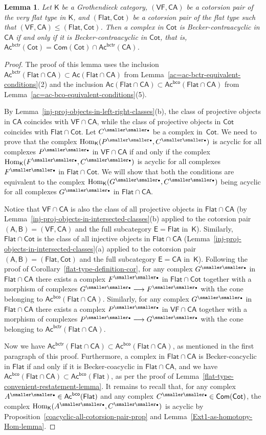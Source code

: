 \documentclass[12pt,a4paper]{amsart}
\newcommand{\+}{\nobreakdash-}
\renewcommand{\:}{\colon}
\newcommand{\rarrow}{\longrightarrow}
\newcommand{\bu}{{\text{\smaller\smaller$\scriptstyle\bullet$}}}
\DeclareMathOperator{\Hom}{Hom}
\newcommand{\sA}{\mathsf A}
\newcommand{\sB}{\mathsf B}
\newcommand{\sE}{\mathsf E}
\newcommand{\sK}{\mathsf K}
\newcommand{\VF}{\mathsf{VF}}
\newcommand{\CA}{\mathsf{CA}}
\newcommand{\Flat}{\mathsf{Flat}}
\newcommand{\Cot}{\mathsf{Cot}}
\newcommand{\Com}{\mathsf{Com}}
\newcommand{\Ac}{\mathsf{Ac}}
\newcommand{\bco}{\mathsf{bco}}
\newcommand{\bctr}{\mathsf{bctr}}
\theoremstyle{plain}
\newtheorem{lem}[thm]{Lemma}
\theoremstyle{definition}
\begin{document}
\begin{lem} \label{contraacyclic-in-Cot-same-as-in-CA}
 Let\/ $\sK$ be a Grothendieck category, $(\VF,\CA)$ be a cotorsion pair
of the very flat type in\/ $\sK$, and $(\Flat,\Cot)$ be a cotorsion pair
of the flat type such that $(\VF,\CA)\le(\Flat,\Cot)$.
 Then a complex in\/ $\Cot$ is Becker-contraacyclic in\/ $\CA$ if and
only if it is Becker-contraacyclic in\/ $\Cot$, that is,
$\Ac^\bctr(\Cot)=\Com(\Cot)\cap\Ac^\bctr(\CA)$.
\end{lem}

\begin{proof}
 The proof of this lemma uses the inclusion
$\Ac^\bctr(\Flat\cap\CA)\subset\Ac(\Flat\cap\CA)$ from
Lemma~\ref{ac=ac-bctr-equivalent-conditions}(2) and the inclusion
$\Ac(\Flat\cap\CA)\subset\Ac^\bco(\Flat\cap\CA)$ from
Lemma~\ref{ac=ac-bco-equivalent-conditions}(5).

 By Lemma~\ref{inj-proj-objects-in-left-right-classes}(b), the class
of projective objects in $\CA$ coincides with $\VF\cap\CA$, while
the class of projective objects in $\Cot$ coincides with
$\Flat\cap\Cot$.
 Let $C^\bu$ be a complex in~$\Cot$.
 We need to prove that the complex $\Hom_\sK(P^\bu,C^\bu)$ is acyclic
for all complexes $P^\bu$ in $\VF\cap\CA$ if and only if the complex
$\Hom_\sK(F^\bu,C^\bu)$ is acyclic for all complexes $F^\bu$ in
$\Flat\cap\Cot$.
 We will show that both the conditions are equivalent to the complex
$\Hom_\sK(G^\bu,C^\bu)$ being acyclic for all complexes $G^\bu$ in
$\Flat\cap\CA$.

 Notice that $\VF\cap\CA$ is also the class of all projective objects
in $\Flat\cap\CA$
(by Lemma~\ref{inj-proj-objects-in-intersected-classes}(b) applied
to the cotorsion pair $(\sA,\sB)=(\VF,\CA)$ and the full subcategory
$\sE=\Flat$ in~$\sK$).
 Similarly, $\Flat\cap\Cot$ is the class of all injective objects in
$\Flat\cap\CA$
(Lemma~\ref{inj-proj-objects-in-intersected-classes}(a) applied
to the cotorsion pair $(\sA,\sB)=(\Flat,\Cot)$ and the full subcategory
$\sE=\CA$ in~$\sK$).
 Following the proof of Corollary~\ref{flat-type-definition-cor},
for any complex $G^\bu$ in $\Flat\cap\CA$ there exists a complex
$F^\bu$ in $\Flat\cap\Cot$ together with a morphism of complexes
$G^\bu\rarrow F^\bu$ with the cone belonging to
$\Ac^\bco(\Flat\cap\CA)$.
 Similarly, for any complex $G^\bu$ in $\Flat\cap\CA$ there exists
a complex $P^\bu$ in $\VF\cap\CA$ together with a morphism of complexes
$P^\bu\rarrow G^\bu$ with the cone belonging to
$\Ac^\bctr(\Flat\cap\CA)$.

 Now we have $\Ac^\bctr(\Flat\cap\CA)\subset\Ac^\bco(\Flat\cap\CA)$,
as mentioned in the first paragraph of this proof.
 Furthermore, a complex in $\Flat\cap\CA$ is Becker-coacyclic in
$\Flat$ if and only if it is Becker-coacyclic in $\Flat\cap\CA$,
and we have $\Ac^\bco(\Flat\cap\CA)\subset\Ac^\bco(\Flat)$, as per
the proof of Lemma~\ref{flat-type-convenient-restatement-lemma}.
 It remains to recall that, for any complex
$A^\bu\in\Ac^\bco(\Flat)$ and any complex $C^\bu\in\Com(\Cot)$,
the complex $\Hom_\sK(A^\bu,C^\bu)$ is acyclic by
Proposition~\ref{coacyclic-all-cotorsion-pair-prop} and
Lemma~\ref{Ext1-as-homotopy-Hom-lemma}.
\end{proof}
\end{document}
